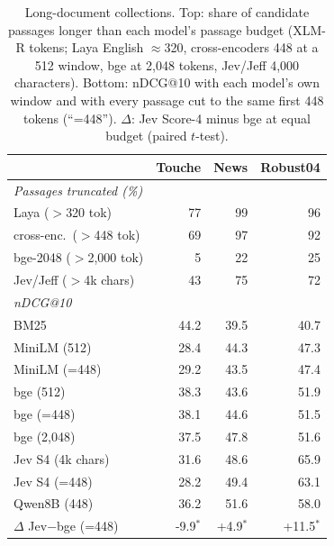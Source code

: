 \begin{table}[t]
\centering
\small
\setlength{\tabcolsep}{3pt}
\caption{Long-document collections. Top: share of candidate passages longer than each model's passage budget (XLM-R tokens; Laya English $\approx$320, cross-encoders 448 at a 512 window, bge at 2{,}048 tokens, Jev/Jeff 4{,}000 characters). Bottom: nDCG@10 with each model's own window and with every passage cut to the same first 448 tokens (``=448''). $\Delta$: Jev Score-4 minus bge at equal budget (paired $t$-test).}
\label{tab:longdoc}
\begin{tabular}{lrrr}
\toprule
 & Touche & News & Robust04 \\
\midrule
\multicolumn{4}{l}{\textit{Passages truncated (\%)}} \\
\quad Laya ($>$320 tok) & 77 & 99 & 96 \\
\quad cross-enc.\ ($>$448 tok) & 69 & 97 & 92 \\
\quad bge-2048 ($>$2{,}000 tok) & 5 & 22 & 25 \\
\quad Jev/Jeff ($>$4k chars) & 43 & 75 & 72 \\
\midrule
\multicolumn{4}{l}{\textit{nDCG@10}} \\
\quad BM25 & 44.2 & 39.5 & 40.7 \\
\quad MiniLM (512) & 28.4 & 44.3 & 47.3 \\
\quad MiniLM (=448) & 29.2 & 43.5 & 47.4 \\
\quad bge (512) & 38.3 & 43.6 & 51.9 \\
\quad bge (=448) & 38.1 & 44.6 & 51.5 \\
\quad bge (2{,}048) & 37.5 & 47.8 & 51.6 \\
\quad Jev S4 (4k chars) & 31.6 & 48.6 & 65.9 \\
\quad Jev S4 (=448) & 28.2 & 49.4 & 63.1 \\
\quad Qwen8B (448) & 36.2 & 51.6 & 58.0 \\
\midrule
$\Delta$ Jev$-$bge (=448) & -9.9$^{*}$ & +4.9$^{*}$ & +11.5$^{*}$ \\
\bottomrule
\end{tabular}
\end{table}